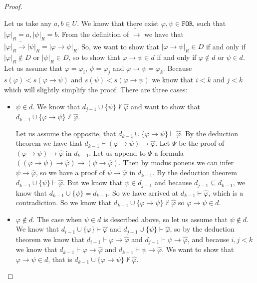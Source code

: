 \documentclass{article}
\theoremstyle{definition}
\theoremstyle{definition}
\theoremstyle{definition}
\newcommand*{\ra}{\rightarrow}
\newcommand*{\FOR}{\texttt{FOR}}
\begin{document}
\begin{proof}
\begin{itemize}
              Let us take any $a, b \in U$. We know that there exist $\varphi, \psi \in
                  \FOR$, such that $|\varphi|_R = a, |\psi|_R = b$. From the definition of
              $\tilde{\ra}$ we have that $|\varphi|_R \tilde{\ra} |\psi|_R = |\varphi \ra
                  \psi|_R$. So, we want to show that $|\varphi \ra \psi|_R \in D$ if and only if
              $|\varphi|_R \not \in D$ or $|\psi|_R \in D$, so to show that $\varphi \ra \psi
                  \in d$ if and only if $\varphi \not \in d$ or $\psi \in d$. Let us assume that
              $\varphi = \varphi_i$, $\psi = \varphi_j$ and $\varphi \ra \psi = \varphi_k$.
              Because $s(\varphi) < s(\varphi \ra \psi)$ and $s(\psi) < s(\varphi \ra \psi)$
              we know that $i < k$ and $j < k$ which will slightly simplify the proof. There
              are three cases:
              \begin{itemize}
                  \item $\psi \in d$. We know that $d_{j-1} \cup \{\psi\} \not \vdash \hat{\varphi}$ and want to show that $d_{k-1} \cup \{\varphi \ra \psi\} \not \vdash \hat{\varphi}$.

                        Let us assume the opposite, that $d_{k-1} \cup \{\varphi \ra \psi\} \vdash
                            \hat{\varphi}$. By the deduction theorem we have that $d_{k-1} \vdash (\varphi
                            \ra \psi) \ra \hat{\varphi}$. Let $\Psi$ be the proof of $(\varphi \ra \psi)
                            \ra \hat{\varphi}$ in $d_{k-1}$. Let us append to $\Psi$ a formula $((\varphi
                            \ra \psi) \ra \hat{\varphi}) \ra (\psi \ra \hat{\varphi})$. Then by modus
                        ponens we can infer $\psi \ra \hat{\varphi}$, so we have a proof of $\psi \ra
                            \hat{\varphi}$ in $d_{k-1}$. By the deduction theorem $d_{k-1} \cup \{\psi\}
                            \vdash \hat{\varphi}$. But we know that $\psi \in d_{j-1}$ and because $d_{j-1}
                            \subseteq d_{k-1}$, we know that $d_{k-1} \cup \{\psi\} = d_{k-1}$. So we have
                        arrived at $d_{k-1} \vdash \hat{\varphi}$, which is a contradiction. So we know
                        that $d_{k-1} \cup \{\varphi \ra \psi\} \not \vdash \hat{\varphi}$ so $\varphi
                            \ra \psi \in d$.

                  \item $\varphi \not \in d$. The case when $\psi \in d$ is described above, so let us assume that $\psi \not \in d$. We know that $d_{i-1} \cup \{\varphi\} \vdash \hat{\varphi}$ and $d_{j-1} \cup \{\psi\} \vdash \hat{\varphi}$, so by the deduction theorem we know that $d_{i-1} \vdash \varphi \ra \hat{\varphi}$ and $d_{j-1} \vdash \psi \ra \hat{\varphi}$, and because $i, j < k$ we know that $d_{k-1} \vdash \varphi \ra \hat{\varphi}$ and $d_{k-1} \vdash \psi \ra \hat{\varphi}$. We want to show that $\varphi \ra \psi \in d$, that is $d_{k-1} \cup \{\varphi \ra \psi\} \not \vdash \hat{\varphi}$.


\end{itemize}
\end{itemize}
\end{proof}
\end{document}
